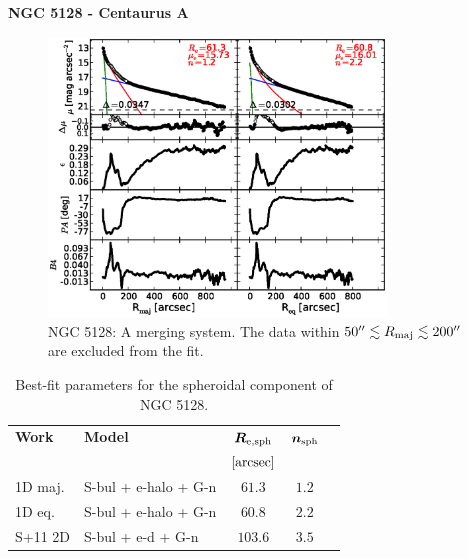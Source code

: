 \documentclass[preprint2]{emulateapj}
\newcommand{\fitfigurewidth}{0.8\textwidth}
\begin{document}
  \clearpage\newpage\noindent

  {\bf NGC 5128 - Centaurus A \\}

  \begin{figure}[h]
  \begin{center}
  \includegraphics[width=\fitfigurewidth]{n5128_1Dfit.eps}
  \caption{NGC 5128: 
  A merging system. 
  The data within $50'' \lesssim R_{\rm maj} \lesssim 200''$ are excluded from the fit.}
  \end{center}
  \end{figure}

  \begin{table}[h]
  \small
  \caption{Best-fit parameters for the spheroidal component of NGC 5128.}
  \begin{center}
  \begin{tabular}{llccc}
  \hline
  {\bf Work} & {\bf Model}   & $\bm R_{\rm e,sph}$    & $\bm n_{\rm sph}$ \\
    &  &  $[\rm arcsec]$ & \\
  \hline
  1D maj. & S-bul + e-halo + G-n & $61.3$  &  $1.2$ \\
  1D eq.  & S-bul + e-halo + G-n & $60.8$  &  $2.2$ \\
  \hline
  S+11 2D         & S-bul + e-d + G-n    & $103.6$  &  $3.5$ \\
  \hline
  \end{tabular}
  \end{center}
  \label{tab:n5128}
  \end{table}
\end{document}
